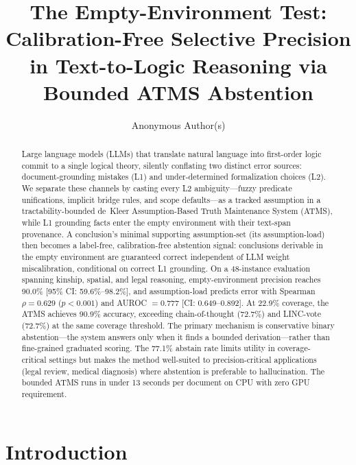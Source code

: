 \documentclass[11pt,letterpaper]{article}
\title{\textbf{The Empty-Environment Test: Calibration-Free Selective Precision\\
in Text-to-Logic Reasoning via Bounded ATMS Abstention}}
\author{%
  Anonymous Author(s)
}
\date{}
\begin{document}
\maketitle

\begin{abstract}
Large language models (LLMs) that translate natural language into first-order logic commit to a single
logical theory, silently conflating two distinct error sources: document-grounding mistakes (L1) and
under-determined formalization choices (L2). We separate these channels by casting every L2
ambiguity---fuzzy predicate unifications, implicit bridge rules, and scope defaults---as a tracked
assumption in a tractability-bounded de~Kleer Assumption-Based Truth Maintenance System (ATMS), while
L1 grounding facts enter the empty environment with their text-span provenance. A conclusion's minimal
supporting assumption-set (its assumption-load) then becomes a label-free, calibration-free abstention
signal: conclusions derivable in the empty environment are guaranteed correct independent of LLM weight
miscalibration, conditional on correct L1 grounding. On a 48-instance evaluation spanning kinship,
spatial, and legal reasoning, empty-environment precision reaches 90.0\% [95\% CI: 59.6\%--98.2\%],
and assumption-load predicts error with Spearman $\rho = 0.629$ ($p < 0.001$) and AUROC $= 0.777$
[CI: 0.649--0.892]. At 22.9\% coverage, the ATMS achieves 90.9\% accuracy, exceeding chain-of-thought
(72.7\%) and LINC-vote (72.7\%) at the same coverage threshold. The primary mechanism is conservative
binary abstention---the system answers only when it finds a bounded derivation---rather than
fine-grained graduated scoring. The 77.1\% abstain rate limits utility in coverage-critical settings
but makes the method well-suited to precision-critical applications (legal review, medical diagnosis)
where abstention is preferable to hallucination. The bounded ATMS runs in under 13 seconds per
document on CPU with zero GPU requirement.
\end{abstract}

\section{Introduction}
\end{document}
